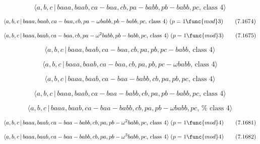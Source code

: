 \documentclass[10pt]{article}
\begin{document}
\begin{equation}
\langle a,b,c\,|\,baaa,baab,ca-baa,cb,pa-babb,pb-babb,pc,\,\text{class }%
4\rangle  \tag{7.1673}
\end{equation}

\begin{equation}
\langle a,b,c\,|\,baaa,baab,ca-baa,cb,pa-\omega babb,pb-babb,pc,\,\text{%
class }4\rangle \;(p=1\func{mod}3)  \tag{7.1674}
\end{equation}

\begin{equation}
\langle a,b,c\,|\,baaa,baab,ca-baa,cb,pa-\omega ^{2}babb,pb-babb,pc,\,\text{%
class }4\rangle \;(p=1\func{mod}3)  \tag{7.1675}
\end{equation}

\begin{equation}
\langle a,b,c\,|\,baaa,baab,ca-baa,cb,pa,pb,pc-babb,\,\text{class }4\rangle 
\tag{7.1676}
\end{equation}

\begin{equation}
\langle a,b,c\,|\,baaa,baab,ca-baa,cb,pa,pb,pc-\omega babb,\,\text{class }%
4\rangle  \tag{7.1677}
\end{equation}

\begin{equation}
\langle a,b,c\,|\,baaa,baab,ca-baa-babb,cb,pa,pb,pc,\,\text{class }4\rangle 
\tag{7.1678}
\end{equation}

\begin{equation}
\langle a,b,c\,|\,baaa,baab,ca-baa-babb,cb,pa,pb-babb,pc,\,\text{class }%
4\rangle  \tag{7.1679}
\end{equation}

\begin{equation}
\langle a,b,c\,|\,baaa,baab,ca-baa-babb,cb,pa,pb-\omega babb,pc,\,\text{%
class }4\rangle  \tag{7.1680}
\end{equation}

\begin{equation}
\langle a,b,c\,|\,baaa,baab,ca-baa-babb,cb,pa,pb-\omega ^{2}babb,pc,\,\text{%
class }4\rangle \;(p=1\func{mod}4)  \tag{7.1681}
\end{equation}

\begin{equation}
\langle a,b,c\,|\,baaa,baab,ca-baa-babb,cb,pa,pb-\omega ^{3}babb,pc,\,\text{%
class }4\rangle \;(p=1\func{mod}4)  \tag{7.1682}
\end{equation}
\end{document}

